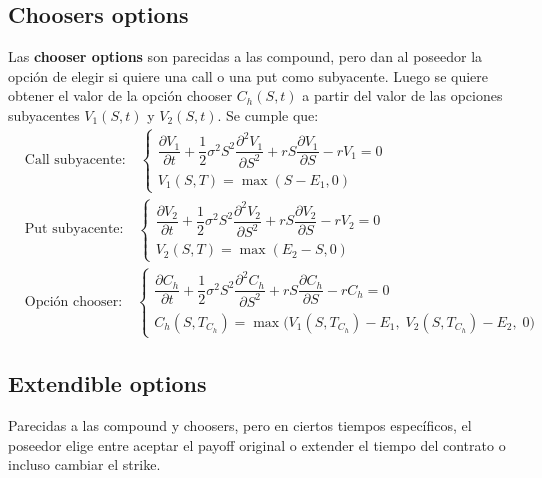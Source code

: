 \subsection{Choosers options}
Las \textbf{chooser options} son parecidas a las compound, pero dan al poseedor la opción de elegir si quiere una call o una put como subyacente. Luego se quiere obtener el valor de la opción chooser $C_h(S,t)$ a partir del valor de las opciones subyacentes $V_1(S,t)$ y $V_2(S,t)$. Se cumple que:
\[
    \boxed{
        \begin{aligned}
            &\text{Call subyacente:} \quad
            \begin{cases}
                \dfrac{\partial V_1}{\partial t} + \dfrac{1}{2}\sigma^2 S^2 \dfrac{\partial^2 V_1}{\partial S^2} + r S \dfrac{\partial V_1}{\partial S} - r V_1 = 0 \\
                V_1(S, T) = \max(S - E_1, 0)
            \end{cases} \\[2ex]
            &\text{Put subyacente:} \quad
            \begin{cases}
                \dfrac{\partial V_2}{\partial t} + \dfrac{1}{2}\sigma^2 S^2 \dfrac{\partial^2 V_2}{\partial S^2} + r S \dfrac{\partial V_2}{\partial S} - r V_2 = 0 \\
                V_2(S, T) = \max(E_2 - S, 0)
            \end{cases} \\[2ex]
            &\text{Opción chooser:} \quad
            \begin{cases}
                \dfrac{\partial C_h}{\partial t} + \dfrac{1}{2}\sigma^2 S^2 \dfrac{\partial^2 C_h}{\partial S^2} + r S \dfrac{\partial C_h}{\partial S} - r C_h = 0 \\
                C_h(S, T_{C_h}) = \max\big(V_1(S, T_{C_h}) - E_1,\; V_2(S, T_{C_h}) - E_2,\; 0\big)
            \end{cases}
        \end{aligned}
    }
\]



\subsection{Extendible options}
Parecidas a las compound y choosers, pero en ciertos tiempos específicos, el poseedor elige entre aceptar el payoff original o extender el tiempo del contrato o incluso cambiar el strike.





